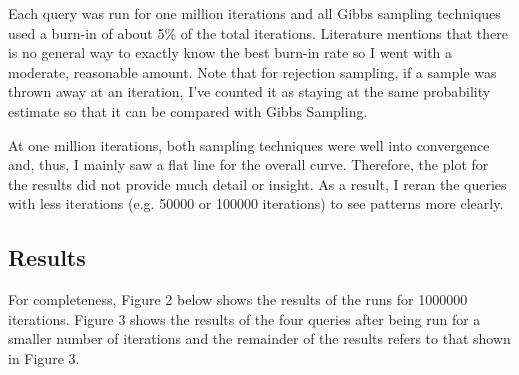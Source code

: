 \documentclass{article} %
\begin{document}
Each query was run for one million iterations and all Gibbs sampling techniques used a burn-in of about 5\% of the total iterations. Literature mentions that there is no general way to exactly know the best burn-in rate so I went with a moderate, reasonable amount. Note that for rejection sampling, if a sample was thrown away at an iteration, I've counted it as staying at the same probability estimate so that it can be compared with Gibbs Sampling.

At one million iterations, both sampling techniques were well into convergence and, thus, I mainly saw a flat line for the overall curve. Therefore, the plot for the results did not provide much detail or insight. As a result, I reran the queries with less iterations (e.g. 50000 or 100000 iterations) to see patterns more clearly. 

\subsection{Results}

For completeness, Figure 2 below shows the results of the runs for 1000000 iterations. Figure 3 shows the results of the four queries after being run for a smaller number of iterations and the remainder of the results refers to that shown in Figure 3.
\end{document}
